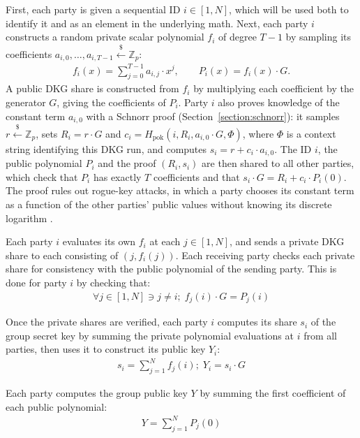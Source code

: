 \documentclass{article}
\theoremstyle{plain}
\theoremstyle{definition}
\theoremstyle{remark}
\newcommand\sample{\xleftarrow{\$}}
\begin{document}
First, each party is given a sequential ID $i \in [1, N]$, which will be used both to identify it and as an element in the underlying math.  Next, each party $i$ constructs a random private scalar polynomial $f_i$ of degree $T-1$ by sampling its coefficients $a_{i,0}, \ldots, a_{i,T-1} \sample \mathbb{Z}_p$:
\begin{align}\label{equation:frost-polynomial}
  f_i(x) = \sum_{j=0}^{T-1} a_{i,j} \cdot x^j, \qquad P_i(x) = f_i(x) \cdot G.
\end{align}
A public DKG share is constructed from $f_i$ by multiplying each coefficient by the generator $G$, giving the coefficients of $P_i$.  Party $i$ also proves knowledge of the constant term $a_{i,0}$ with a Schnorr proof (Section~\ref{section:schnorr}): it samples $r \sample \mathbb{Z}_p$, sets $R_i = r \cdot G$ and $c_i = H_{\mathrm{pok}}(i, R_i, a_{i,0} \cdot G, \Phi)$, where $\Phi$ is a context string identifying this DKG run, and computes $s_i = r + c_i \cdot a_{i,0}$.  The ID $i$, the public polynomial $P_i$ and the proof $(R_i, s_i)$ are then shared to all other parties, which check that $P_i$ has exactly $T$ coefficients and that $s_i \cdot G = R_i + c_i \cdot P_i(0)$.  The proof rules out rogue-key attacks, in which a party chooses its constant term as a function of the other parties' public values without knowing its discrete logarithm \cite{frost}.

Each party $i$ evaluates its own $f_i$ at each $j \in [1,N]$, and sends a private DKG share to each consisting of $(j, f_i(j))$.  Each receiving party checks each private share for consistency with the public polynomial of the sending party.  This is done for party $i$ by checking that:
\begin{align}\label{equation:frost-dkg-check}
  \forall j \in [1,N] \ni j \neq i;\;f_j(i) \cdot G = P_j(i)
\end{align}

Once the private shares are verified, each party $i$ computes its share $s_i$ of the group secret key by summing the private polynomial evaluations at $i$ from all parties, then uses it to construct its public key $Y_i$:
\begin{align}\label{equation:frost-share}
  s_i = \sum_{j=1}^{N} f_j(i) ;\; Y_i = s_i \cdot G
\end{align}

Each party computes the group public key $Y$ by summing the first coefficient of each public polynomial:
\begin{align}\label{equation:frost-group-key}
  Y = \sum_{j=1}^{N} P_j(0)
\end{align}
\end{document}
